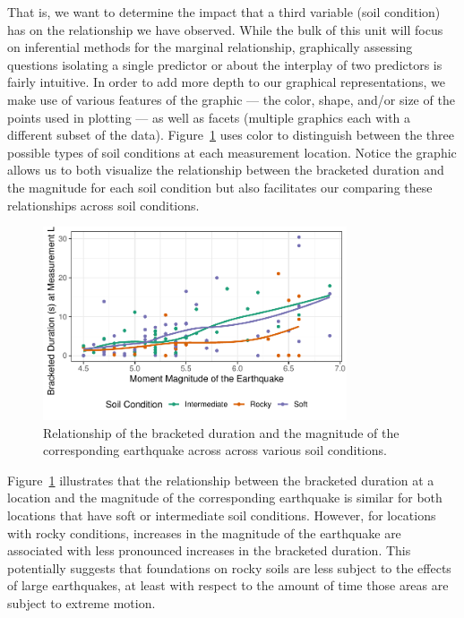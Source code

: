 \documentclass[
  letterpaper,
  DIV=11,
  numbers=noendperiod]{scrreprt}
\theoremstyle{plain}
\theoremstyle{definition}
\theoremstyle{definition}
\theoremstyle{remark}
\begin{document}
That is, we want to determine the impact that a third variable (soil
condition) has on the relationship we have observed. While the bulk of
this unit will focus on inferential methods for the marginal
relationship, graphically assessing questions isolating a single
predictor or about the interplay of two predictors is fairly intuitive.
In order to add more depth to our graphical representations, we make use
of various features of the graphic --- the color, shape, and/or size of
the points used in plotting --- as well as facets (multiple graphics
each with a different subset of the data).
Figure~\ref{fig-regsummaries-color} uses color to distinguish between
the three possible types of soil conditions at each measurement
location. Notice the graphic allows us to both visualize the
relationship between the bracketed duration and the magnitude for each
soil condition but also facilitates our comparing these relationships
across soil conditions.

\begin{figure}

{\centering \includegraphics[width=0.8\textwidth,height=\textheight]{./images/fig-regsummaries-color-1.pdf}

}

\caption{\label{fig-regsummaries-color}Relationship of the bracketed
duration and the magnitude of the corresponding earthquake across across
various soil conditions.}

\end{figure}

Figure~\ref{fig-regsummaries-color} illustrates that the relationship
between the bracketed duration at a location and the magnitude of the
corresponding earthquake is similar for both locations that have soft or
intermediate soil conditions. However, for locations with rocky
conditions, increases in the magnitude of the earthquake are associated
with less pronounced increases in the bracketed duration. This
potentially suggests that foundations on rocky soils are less subject to
the effects of large earthquakes, at least with respect to the amount of
time those areas are subject to extreme motion.
\end{document}
